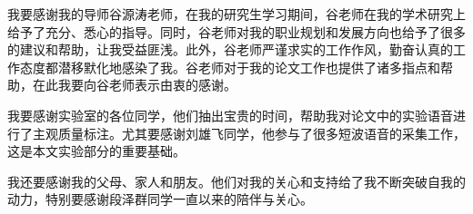 \begin{acknowledgement}

我要感谢我的导师谷源涛老师，在我的研究生学习期间，谷老师在我的学术研究上给予了充分、悉心的指导。同时，谷老师对我的职业规划和发展方向也给予了很多的建议和帮助，让我受益匪浅。此外，谷老师严谨求实的工作作风，勤奋认真的工作态度都潜移默化地感染了我。谷老师对于我的论文工作也提供了诸多指点和帮助，在此我要向谷老师表示由衷的感谢。

我要感谢实验室的各位同学，他们抽出宝贵的时间，帮助我对论文中的实验语音进行了主观质量标注。尤其要感谢刘雄飞同学，他参与了很多短波语音的采集工作，这是本文实验部分的重要基础。

我还要感谢我的父母、家人和朋友。他们对我的关心和支持给了我不断突破自我的动力，特别要感谢段泽群同学一直以来的陪伴与关心。

\end{acknowledgement}
